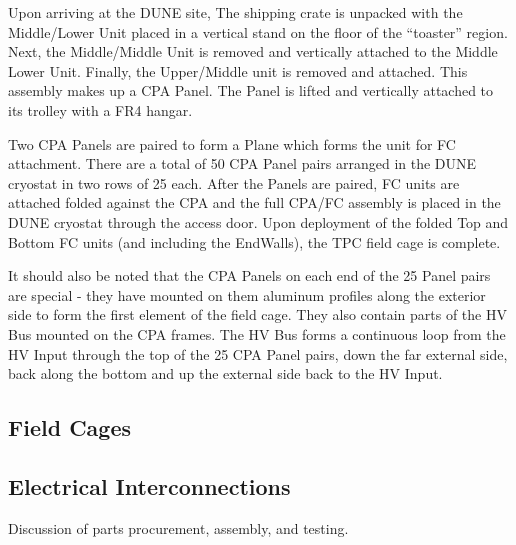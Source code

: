Upon arriving at the DUNE site, The shipping crate is unpacked with the Middle/Lower Unit placed in a vertical stand on the floor of the ``toaster'' region.  Next, the Middle/Middle Unit is removed and vertically attached to the Middle Lower Unit.  Finally, the Upper/Middle unit is removed and attached.  This assembly makes up a CPA Panel.  The Panel is lifted and vertically attached to its trolley with a FR4 hangar.

Two CPA Panels are paired to form a Plane which forms the unit for FC attachment.  There are a total of 50 CPA Panel pairs arranged in the DUNE cryostat in two rows of 25 each.  After the Panels are paired, FC units are attached folded against the CPA and the full CPA/FC assembly is placed in the DUNE cryostat through the access door.  Upon deployment of the folded Top and Bottom FC units (and including the EndWalls), the TPC field cage is complete.

It should also be noted that the CPA Panels on each end of the 25 Panel pairs are special - they have mounted on them aluminum profiles along the exterior side to form the first element of the field cage.  They also contain parts of the HV Bus mounted on the CPA frames.  The HV Bus forms a continuous loop from the HV Input through the top of the 25 CPA Panel pairs, down the far external side, back along the bottom and up the  external side back to the HV Input.

\subsection{Field Cages}

\subsection{Electrical Interconnections}

Discussion of parts procurement, assembly, and testing.

